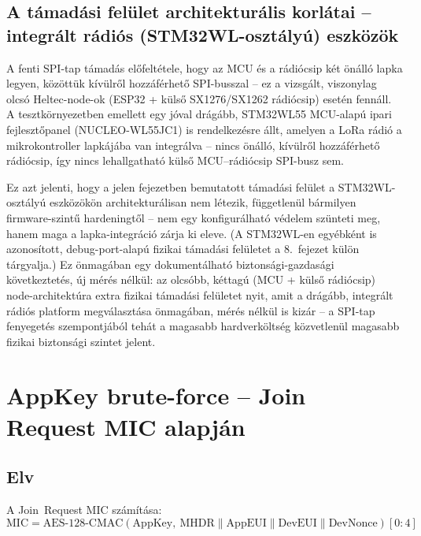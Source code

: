 \documentclass[12pt,a4paper]{article}
\begin{document}
\subsection{A támadási felület architekturális korlátai -- integrált rádiós
(STM32WL-osztályú) eszközök}

A fenti SPI-tap támadás előfeltétele, hogy az MCU és a rádiócsip két önálló
lapka legyen, közöttük kívülről hozzáférhető SPI-busszal -- ez a vizsgált,
viszonylag olcsó Heltec-node-ok (ESP32 + külső SX1276/SX1262 rádiócsip)
esetén fennáll. A tesztkörnyezetben emellett egy jóval drágább, STM32WL55
MCU-alapú ipari fejlesztőpanel (NUCLEO-WL55JC1) is rendelkezésre állt,
amelyen a LoRa rádió a mikrokontroller lapkájába van integrálva -- nincs
önálló, kívülről hozzáférhető rádiócsip, így nincs lehallgatható külső
MCU--rádiócsip SPI-busz sem.

Ez azt jelenti, hogy a jelen fejezetben bemutatott támadási felület a
STM32WL-osztályú eszközökön architekturálisan nem létezik, függetlenül
bármilyen firmware-szintű hardeningtől -- nem egy konfigurálható védelem
szünteti meg, hanem maga a lapka-integráció zárja ki eleve. (A STM32WL-en
egyébként is azonosított, debug-port-alapú fizikai támadási felületet a
8.\ fejezet külön tárgyalja.) Ez önmagában egy dokumentálható
biztonsági-gazdasági következtetés, új mérés nélkül: az olcsóbb, kéttagú
(MCU + külső rádiócsip) node-architektúra extra fizikai támadási felületet
nyit, amit a drágább, integrált rádiós platform megválasztása önmagában,
mérés nélkül is kizár -- a SPI-tap fenyegetés szempontjából tehát a
magasabb hardverköltség közvetlenül magasabb fizikai biztonsági szintet
jelent.

\section{AppKey brute-force -- Join Request MIC alapján}

\subsection{Elv}

A Join~Request MIC számítása:
\begin{equation}
    \text{MIC} = \text{AES-128-CMAC}(\text{AppKey},\
    \text{MHDR} \mathbin\| \text{AppEUI} \mathbin\|
    \text{DevEUI} \mathbin\| \text{DevNonce})[0:4]
\end{equation}
\end{document}
